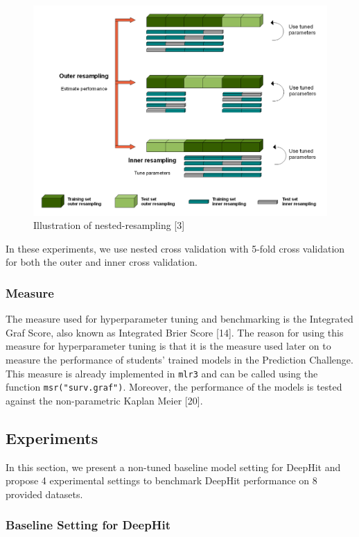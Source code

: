 \documentclass[
]{article}
\begin{document}
\begin{figure}

{\centering \includegraphics[width=0.7\linewidth]{nested-resampling} 

}

\caption{Illustration of nested-resampling {[}3{]}}\label{fig:nested-resampling}
\end{figure}

In these experiments, we use nested cross validation with 5-fold cross validation for both the outer and inner cross validation.

\hypertarget{measure}{%
\subsubsection{Measure}\label{measure}}

The measure used for hyperparameter tuning and benchmarking is the Integrated Graf Score, also known as Integrated Brier Score {[}14{]}. The reason for using this measure for hyperparameter tuning is that it is the measure used later on to measure the performance of students' trained models in the Prediction Challenge. This measure is already implemented in \texttt{mlr3} and can be called using the function \texttt{msr("surv.graf")}. Moreover, the performance of the models is tested against the non-parametric Kaplan Meier {[}20{]}.

\hypertarget{experiments}{%
\subsection{Experiments}\label{experiments}}

In this section, we present a non-tuned baseline model setting for DeepHit and propose 4 experimental settings to benchmark DeepHit performance on 8 provided datasets.

\hypertarget{baseline-setting-for-deephit}{%
\subsubsection{Baseline Setting for DeepHit}\label{baseline-setting-for-deephit}}
\end{document}
